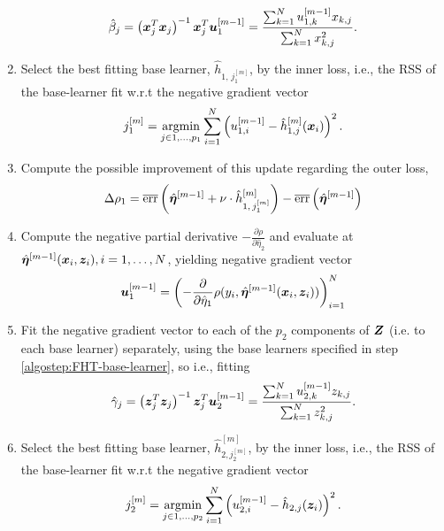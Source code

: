 \begin{enumerate}
        \begin{equation*}
            \hat{\beta}_j=\left(\bm{x}_j^T\bm{x}_j\right)^{-1}\bm{x}_j^T \bm{u}^{[m-1]}_1=\frac{\sum_{k=1}^N u^{[m-1]}_{1,k}x_{k,j}}{\sum_{k=1}^N x_{k,j}^2}.
        \end{equation*}
    \item
        Select the best fitting base learner, $\hat{h}_{1,\,j_1^{[m]}}$, by the inner loss,
        i.e., the RSS of the base-learner fit w.r.t the negative gradient vector
        \begin{equation*}
            j_1^{[m]}=\operatorname*{argmin}_{j\in 1,\ldots,p_1}\sum_{i=1}^N\left(u_{1,i}^{[m-1]}-\hat{h}^{[m]}_{1,j}(\bm{x}_i)\right)^2.
        \end{equation*}
    \item
        Compute the possible improvement of this update regarding the outer loss,
        \begin{equation*}
            \Delta\rho_1=\overline{\text{err}}\left(\hat{\boldsymbol{\eta}}^{[m-1]} + \nu \cdot \hat{h}^{[m]}_{1,\,j_1^{[m]}} \right)-\overline{\text{err}}\left(\hat{\boldsymbol{\eta}}^{[m-1]} \right)
        \end{equation*}
    \item
        Compute the negative partial derivative $-\frac{\partial\rho}{\partial \hat{\eta}_2}$
        and evaluate at $\hat{\boldsymbol{\eta}}^{[m-1]}(\bm{x}_i,\bm{z}_i),i=1,\ldots,N$, yielding negative gradient vector
        \begin{equation*}
            \bm{u}^{[m-1]}_1=\left(-\frac{\partial}{\partial \hat{\eta}_1}\rho(y_i, \hat{\boldsymbol{\eta}}^{[m-1]}(\bm{x}_i,\bm{z}_i))\right)_{i=1}^N
        \end{equation*}
    \item
        Fit the negative gradient vector to each of the $p_2$ components of $\bm{Z}$ (i.e. to each base learner) separately, using the base learners specified in step \ref{algostep:FHT-base-learner}, so i.e., fitting
        \begin{equation*}
            \hat{\gamma}_j=\left(\bm{z}_j^T\bm{z}_j\right)^{-1}\bm{z}_j^T \bm{u}^{[m-1]}_2=\frac{\sum_{k=1}^N u^{[m-1]}_{2,k}z_{k,j}}{\sum_{k=1}^N z_{k,j}^2}.
        \end{equation*}
    \item
        Select the best fitting base learner, $\hat{h}^{[m]}_{2,j_2^{[m]}}$, by the inner loss,
        i.e., the RSS of the base-learner fit w.r.t the negative gradient vector
        \begin{equation*}
            j_2^{[m]}=\argmin_{j\in 1,\ldots,p_2}\sum_{i=1}^N\left(u_{2,i}^{[m-1]}-\hat{h}_{2,j}(\z_i)\right)^2.

\end{equation*}
\end{enumerate}
